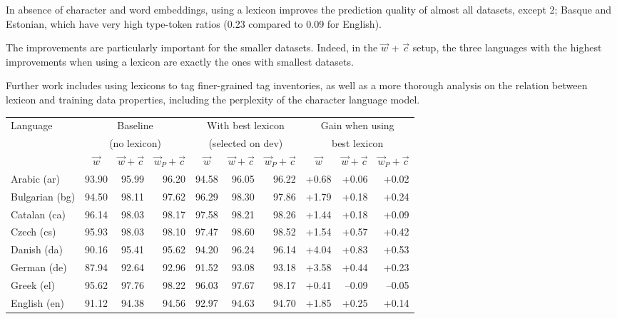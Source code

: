 \documentclass[11pt,letterpaper]{article}
\begin{document}
In absence of character and word embeddings, using a lexicon improves the prediction quality of almost all datasets, except 2; Basque and Estonian, which have very high type-token ratios (0.23 compared to 0.09 for English).

The improvements are particularly important for the smaller datasets. Indeed, in the $\vec{w}$ + $\vec{c}$ setup, the three languages with the highest improvements when using a lexicon are exactly the ones with smallest datasets.

Further work includes using lexicons to tag finer-grained tag inventories, as well as a more thorough analysis on the relation between lexicon and training data properties, including the perplexity of the character language model.

\begin{table}
\centering\scriptsize
\begin{tabular}{l|rrr|rrr|rrr}
\toprule
Language & \multicolumn{3}{c}{Baseline} & \multicolumn{3}{c}{With best lexicon} & \multicolumn{3}{c}{Gain when using} \\
 & \multicolumn{3}{c}{(no lexicon)} & \multicolumn{3}{c}{(selected on dev)} & \multicolumn{3}{c}{best lexicon} \\
 & \multicolumn{1}{c}{$\vec{w}$} & \multicolumn{1}{c}{$\vec{w}+\vec{c}$} & \multicolumn{1}{c}{$\vec{w}_P+\vec{c}$} & \multicolumn{1}{c}{$\vec{w}$} & \multicolumn{1}{c}{$\vec{w}+\vec{c}$} & \multicolumn{1}{c}{$\vec{w}_P+\vec{c}$} & \multicolumn{1}{c}{$\vec{w}$} & \multicolumn{1}{c}{$\vec{w}+\vec{c}$} & \multicolumn{1}{c}{$\vec{w}_P+\vec{c}$} \\
\midrule
Arabic (ar) & 93.90 & 95.99 & 96.20 & 94.58 & 96.05 & 96.22 & +0.68 & +0.06 & +0.02\\
Bulgarian (bg) & 94.50 & 98.11 & 97.62 & 96.29 & 98.30 & 97.86 & +1.79 & +0.18 & +0.24\\
Catalan (ca) & 96.14 & 98.03 & 98.17 & 97.58 & 98.21 & 98.26 & +1.44 & +0.18 & +0.09\\
Czech (cs) & 95.93 & 98.03 & 98.10 & 97.47 & 98.60 & 98.52 & +1.54 & +0.57 & +0.42\\
Danish (da) & 90.16 & 95.41 & 95.62 & 94.20 & 96.24 & 96.14 & +4.04 & +0.83 & +0.53\\
German (de) & 87.94 & 92.64 & 92.96 & 91.52 & 93.08 & 93.18 & +3.58 & +0.44 & +0.23\\
Greek (el) & 95.62 & 97.76 & 98.22 & 96.03 & 97.67 & 98.17 & +0.41 & --0.09 & --0.05\\
English (en) & 91.12 & 94.38 & 94.56 & 92.97 & 94.63 & 94.70 & +1.85 & +0.25 & +0.14\\

\end{tabular}
\end{table}
\end{document}
